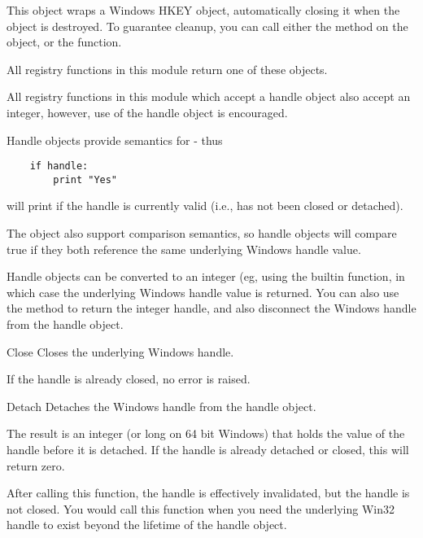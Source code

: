  This object wraps a Windows HKEY object, automatically closing it when
 the object is destroyed.  To guarantee cleanup, you can call either
 the  method on the object, or the 
  function.

 All registry functions in this module return one of these objects.

 All registry functions in this module which accept a handle object 
 also accept an integer, however, use of the handle object is 
 encouraged.
 
 Handle objects provide semantics for  - thus
\begin{verbatim}
    if handle:
        print "Yes"
\end{verbatim}
 will print  if the handle is currently valid (i.e.,
 has not been closed or detached).

 The object also support comparison semantics, so handle
 objects will compare true if they both reference the same
 underlying Windows handle value.

 Handle objects can be converted to an integer (eg, using the
 builtin  function, in which case the underlying
 Windows handle value is returned.  You can also use the 
  method to return the integer handle, and
 also disconnect the Windows handle from the handle object.

\begin{methoddesc}{Close}{}
  Closes the underlying Windows handle.

  If the handle is already closed, no error is raised.
\end{methoddesc}


\begin{methoddesc}{Detach}{}
  Detaches the Windows handle from the handle object.

 The result is an integer (or long on 64 bit Windows) that holds
 the value of the handle before it is detached.  If the
 handle is already detached or closed, this will return zero.

 After calling this function, the handle is effectively invalidated,
 but the handle is not closed.  You would call this function when 
 you need the underlying Win32 handle to exist beyond the lifetime 
 of the handle object.
\end{methoddesc}
